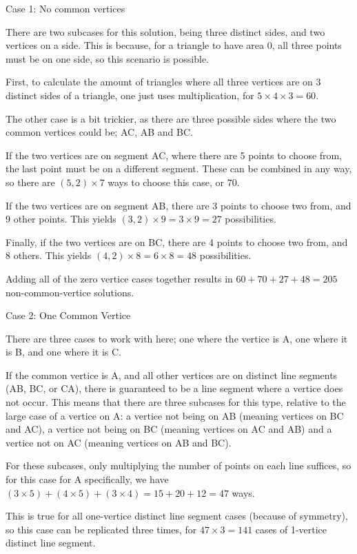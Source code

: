 \begin{enumerate}
 Case 1: No common vertices

 There are two subcases for this solution, being three distinct sides, and two vertices on a side. This is because, for a triangle to have area 0, all three points must be on one side, so this scenario is possible.

 First, to calculate the amount of triangles where all three vertices are on 3 distinct sides of a triangle, one just uses multiplication, for $5\times4\times3=60$.

 The other case is a bit trickier, as there are three possible sides where the two common vertices could be; AC, AB and BC.

 If the two vertices are on segment AC, where there are 5 points to choose from, the last point must be on a different segment. These can be combined in any way, so there are $(5, 2) \times 7$ ways to choose this case, or $70$.

 If the two vertices are on segment AB, there are 3 points to choose two from, and 9 other points. This yields $(3, 2) \times 9 = 3 \times 9 = 27$ possibilities.

 Finally, if the two vertices are on BC, there are 4 points to choose two from, and 8 others. This yields $(4, 2) \times 8 = 6 \times 8 = 48$ possibilities.

 Adding all of the zero vertice cases together results in $60 + 70 + 27 + 48 = 205$ non-common-vertice solutions.

 Case 2: One Common Vertice

 There are three cases to work with here; one where the vertice is A, one where it is B, and one where it is C.

 If the common vertice is A, and all other vertices are on distinct line segments (AB, BC, or CA), there is guaranteed to be a line segment where a vertice does not occur. This means that there are three subcases for this type, relative to the large case of a vertice on A: a vertice not being on AB (meaning vertices on BC and AC), a vertice not being on BC (meaning vertices on AC and AB) and a vertice not on AC (meaning vertices on AB and BC).

 For these subcases, only multiplying the number of points on each line suffices, so for this case for A specifically, we have $(3\times5)+(4\times5)+(3\times4)=15+20+12=47$ ways.

 This is true for all one-vertice distinct line segment cases (because of symmetry), so this case can be replicated three times, for $47 \times 3 = 141$ cases of 1-vertice distinct line segment.


\end{enumerate}
